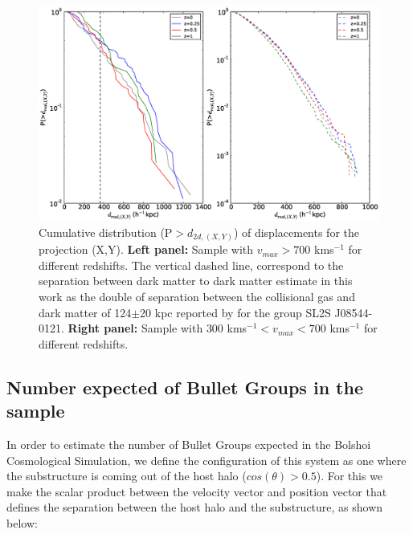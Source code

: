 \documentclass{emulateapj}
\begin{document}
\begin{figure}
\begin{center}
\includegraphics[width=1.1\textwidth]{Figures_eps/figure_7_1.eps}
\end{center}
\caption{Cumulative distribution (P$>d_{2d,(X,Y)}$) of displacements
  for the projection (X,Y). {\bf Left panel:} Sample with
  $v_{max}>700$ kms$^{-1}$  for different redshifts. The vertical
  dashed line, correspond to the separation between dark matter to
  dark matter estimate in this work as the double of separation
  between the collisional gas and dark matter of 124$\pm$20 kpc
  reported by \citet{Gastaldello} for the group SL2S J08544-0121.
  {\bf Right panel:} Sample with $300 $ kms$^{-1} <v_{max}<700 $
  kms$^{-1}$ for different redshifts.}  
\label{displacements}
\end{figure}


\subsection{Number expected of Bullet Groups in the sample}


In order to estimate the number of Bullet Groups expected in the
Bolshoi Cosmological Simulation, we define the configuration of this system as one where the substructure is coming out of the host halo ($cos(\theta)>0.5$). For this 
we make the scalar product between the velocity vector and position vector that defines the separation between 
 the host halo and the substructure, as shown below: \\
 
\end{document}
